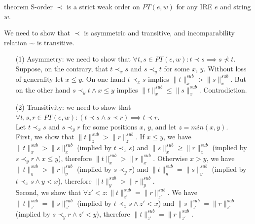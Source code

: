 \documentclass[AMA,STIX1COL]{WileyNJD-v2}
\newcommand{\PT}{PT}
\newcommand{\snorm}[2]{\|{#1}\|^{sub}_{#2}}
\begin{document}
\begin{theoremEnd}[restate, no link to proof, no link to theorem, category=theorem_sorder_on_PTs]{theorem}
    \label{theorem_sorder_on_PTs}
    S-order $\prec$ is a strict weak order on $\PT(e, w)$ for any IRE $e$ and string $w$.
\end{theoremEnd}
\begin{proofEnd}
    We need to show that $\prec$ is asymmetric and transitive, and incomparability relation $\sim$ is transitive.
    \begin{itemize}[itemsep=0.2em, topsep=0.5em]
        \item[(1)]
            Asymmetry: we need to show that $\forall t, s \in \PT(e, w): t \prec s \implies s \not\prec t$.
            \\[0.5em]
            Suppose, on the contrary, that $t \prec_x s$ and $s \prec_y t$ for some $x$, $y$.
            Without loss of generality let $x \leq y$.
            On one hand $t \prec_x s$ implies $\snorm{t}{x} > \snorm{s}{x}$.
            But on the other hand $s \prec_y t \wedge x \leq y$ implies $\snorm{t}{x} \leq \snorm{s}{x}$.
            Contradiction.

        \item[(2)]
            Transitivity: we need to show that $\forall t, s, r \in \PT(e, w): (t \prec s \wedge s \prec r) \implies t \prec r$.
            \\[0.5em]
            Let $t \prec_x s$ and $s \prec_y r$ for some positions $x$, $y$, and let $z = min (x, y)$.
            \\[0.5em]
            First, we show that $\snorm{t}{z} > \snorm{r}{z}$.
            If $x \leq y$, we have $\snorm{t}{x} > \snorm{s}{x}$ (implied by $t \prec_x s$)
            and $\snorm{s}{x} \geq \snorm{r}{x}$ (implied by $s \prec_y r \wedge x \leq y$),
            therefore $\snorm{t}{x} > \snorm{r}{x}$.
            Otherwise $x > y$, we have $\snorm{t}{y} > \snorm{r}{y}$ (implied by $s \prec_y r$)
            and $\snorm{t}{y} = \snorm{s}{y}$ (implied by $t \prec_x s \wedge y < x$),
            therefore $\snorm{t}{y} > \snorm{r}{y}$.
            \\[0.5em]
            Second, we show that $\forall z' < z : \snorm{t}{z'} = \snorm{r}{z'}$.
            We have $\snorm{t}{z'} = \snorm{s}{z'}$ (implied by $t \prec_x s \wedge z' < x$)
            and $\snorm{s}{z'} = \snorm{r}{z'}$ (implied by $s \prec_y r \wedge z' < y$),
            therefore $\snorm{t}{z'} = \snorm{r}{z'}$.


\end{itemize}
\end{proofEnd}
\end{document}
